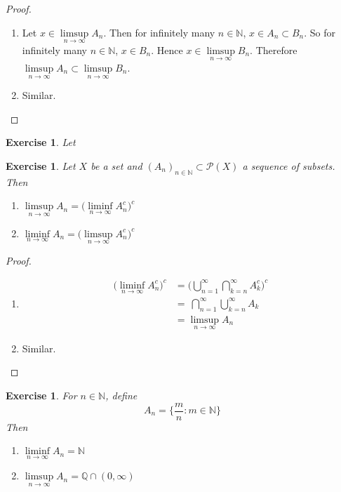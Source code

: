 \documentclass[12pt]{amsart}
\newtheorem{ex}[thm]{Exercise}
\newcommand{\N}{\mathbb{N}}
\newcommand{\Q}{\mathbb{Q}}
\newcommand{\MP}{\mathcal{P}}
\begin{document}
\begin{proof}\
	\begin{enumerate}
		\item Let $x \in \limsup\limits_{n \rightarrow \infty}A_n$. Then for infinitely many $n \in \N$, $x \in A_n \subset B_n$. So for infinitely many $n \in \N$, $x \in B_n$. Hence $x \in \limsup\limits_{n \rightarrow \infty}B_n$. Therefore $\limsup\limits_{n \rightarrow \infty}A_n \subset \limsup\limits_{n \rightarrow \infty}B_n$.
		\item Similar.
	\end{enumerate}
\end{proof}

\begin{ex}
	Let 
\end{ex}

\begin{ex}
	Let $X$ be a set and $(A_n)_{n \in \N} \subset \MP(X)$ a sequence of subsets. Then 
	\begin{enumerate}
		\item $\limsup\limits_{n \rightarrow \infty}A_n = \bigg(\liminf\limits_{n \rightarrow \infty}A_n^c \bigg)^c$
		\item $\liminf\limits_{n \rightarrow \infty}A_n = \bigg(\limsup\limits_{n \rightarrow \infty}A_n^c \bigg)^c$
	\end{enumerate}
\end{ex}

\begin{proof}\
	\begin{enumerate}
		\item \begin{align*}
			\bigg( \liminf\limits_{n \rightarrow \infty}A_n^c \bigg)^c 
			&= \bigg( \bigcup\limits_{n=1}^{\infty} \bigcap\limits_{k=n}^{\infty}A_k^c \bigg)^c\\
			&= \ \bigcap\limits_{n=1}^{\infty}\bigcup\limits_{k=n}^{\infty}A_k  \\
			&=  \limsup\limits_{n \rightarrow \infty}A_n
		\end{align*}
		\item Similar.
	\end{enumerate}
\end{proof}

\begin{ex}
	For $n \in \N$, define $$A_n = \bigg\{ \frac{m}{n}: m \in \N \bigg\}$$ 
	Then
	\begin{enumerate}
		\item $\liminf\limits_{n \rightarrow \infty }A_n = \N$ 
		\item $\limsup\limits_{n \rightarrow \infty }A_n = \Q \cap (0,\infty )$
	\end{enumerate}
\end{ex}
\end{document}
